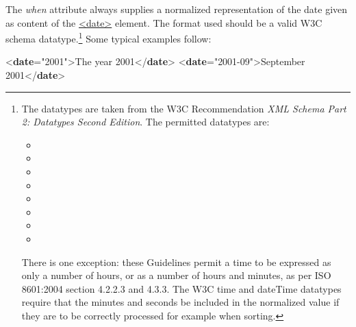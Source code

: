 The {\itshape when} attribute always supplies a normalized representation of the date given as content of the \hyperref[TEI.date]{<date>} element. The format used should be a valid W3C schema datatype.\footnote{The datatypes are taken from the W3C Recommendation \textit{XML Schema Part 2: Datatypes Second Edition}. The permitted datatypes are: \begin{itemize}
\item {}
\item {}
\item {}
\item {}
\item {}
\item {}
\item {}
\item {}
\end{itemize}  There is one exception: these Guidelines permit a time to be expressed as only a number of hours, or as a number of hours and minutes, as per ISO 8601:2004 section 4.2.2.3 and 4.3.3. The W3C \textsf{time} and \textsf{dateTime} datatypes require that the minutes and seconds be included in the normalized value if they are to be correctly processed for example when sorting.} Some typical examples follow: \par\bgroup{}\exampleFont \begin{shaded}\noindent\mbox{}{<\textbf{date}\hspace*{1em}{when}="{2001}">}The year 2001{</\textbf{date}>}\mbox{}\newline 
{<\textbf{date}\hspace*{1em}{when}="{2001-09}">}September 2001{</\textbf{date}>}\mbox{}\newline 

\end{shaded}
